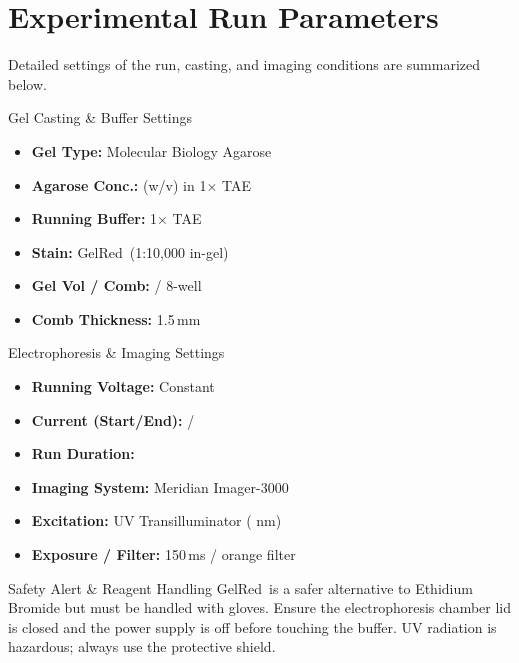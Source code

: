 \section{Experimental Run Parameters}

Detailed settings of the run, casting, and imaging conditions are summarized below.

\vspace{4pt}
\begin{minipage}[t]{0.49\textwidth}
\vspace{0pt}
\begin{settingsbox}{Gel Casting \& Buffer Settings}
\small\renewcommand{\arraystretch}{1.0}%
\begin{itemize}[leftmargin=1.0em,itemsep=1.5pt]
  \item \textbf{Gel Type:} Molecular Biology Agarose
  \item \textbf{Agarose Conc.:}  (w/v) in 1$\times$ TAE
  \item \textbf{Running Buffer:} 1$\times$ TAE
  \item \textbf{Stain:} GelRed\texttrademark\ (1:10,000 in-gel)
  \item \textbf{Gel Vol / Comb:}  / 8-well
  \item \textbf{Comb Thickness:} 1.5\,mm
\end{itemize}
\end{settingsbox}
\end{minipage}%
\hfill%
\begin{minipage}[t]{0.49\textwidth}
\vspace{0pt}
\begin{settingsbox}{Electrophoresis \& Imaging Settings}
\small\renewcommand{\arraystretch}{1.0}%
\begin{itemize}[leftmargin=1.0em,itemsep=1.5pt]
  \item \textbf{Running Voltage:} Constant 
  \item \textbf{Current (Start/End):}  / 
  \item \textbf{Run Duration:} 
  \item \textbf{Imaging System:} Meridian Imager-3000
  \item \textbf{Excitation:} UV Transilluminator ( nm)
  \item \textbf{Exposure / Filter:} 150\,ms / orange filter
\end{itemize}
\end{settingsbox}
\end{minipage}

\par\vspace{4pt}
\begin{warningbox}{Safety Alert \& Reagent Handling}
\small
  GelRed\texttrademark\ is a safer alternative to Ethidium Bromide but must be handled with gloves. Ensure the electrophoresis chamber lid is closed and the power supply is off before touching the buffer. UV radiation is hazardous; always use the protective shield.
\end{warningbox}
